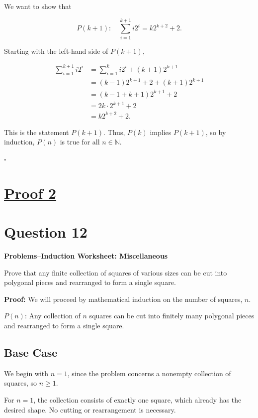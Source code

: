\documentclass[12pt]{article}
\begin{document}
We want to show that

\[
P(k+1):\quad
\sum_{i=1}^{k+1}i2^i=k2^{k+2}+2.
\]

Starting with the left-hand side of $P(k+1)$,

\[
\begin{aligned}
\sum_{i=1}^{k+1}i2^i
&=\sum_{i=1}^{k}i2^i+(k+1)2^{k+1}\\[6pt]
&=(k-1)2^{k+1}+2+(k+1)2^{k+1}\\[6pt]
&=(k-1+k+1)2^{k+1}+2\\[6pt]
&=2k\cdot 2^{k+1}+2\\[6pt]
&=k2^{k+2}+2.
\end{aligned}
\]

This is the statement $P(k+1)$.
Thus, $P(k)$ implies $P(k+1)$, so by induction,
$P(n)$ is true for all $n\in\mathbb{N}$.

\hfill $\square$

\vspace{0.5cm}

\newpage

\section*{\Huge\underline{Proof 2}}

\section*{Question 12}
\vspace{-0.7cm}
\textbf{Problems--Induction Worksheet: Miscellaneous}

\vspace{0.3cm}

Prove that any finite collection of squares of
various sizes can be cut into polygonal pieces
and rearranged to form a single square.

\textbf{Proof:}
We will proceed by mathematical induction on
the number of squares, $n$.

$P(n)$: Any collection of $n$ squares can be
cut into finitely many polygonal pieces and
rearranged to form a single square.

\subsection*{Base Case}

We begin with $n=1$, since the problem concerns
a nonempty collection of squares, so $n\geq 1$.

For $n=1$, the collection consists of exactly
one square, which already has the desired shape.
No cutting or rearrangement is necessary.
\end{document}
